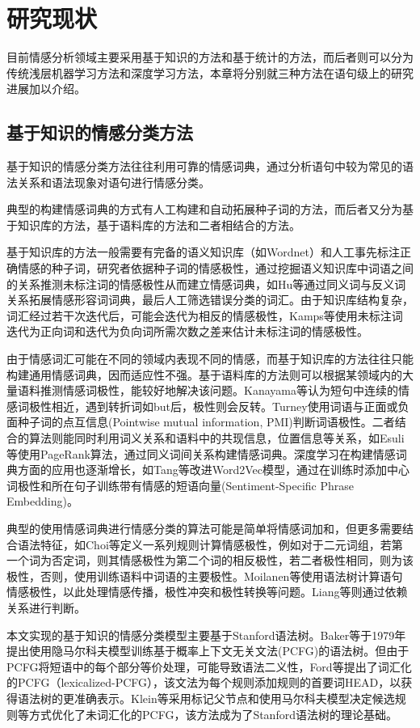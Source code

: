 \section{研究现状}
目前情感分析领域主要采用基于知识的方法和基于统计的方法，而后者则可以分为传统浅层机器学习方法和深度学习方法，本章将分别就三种方法在语句级上的研究进展加以介绍。
\subsection{基于知识的情感分类方法}
基于知识的情感分类方法往往利用可靠的情感词典，通过分析语句中较为常见的语法关系和语法现象对语句进行情感分类。

典型的构建情感词典的方式有人工构建和自动拓展种子词的方法，而后者又分为基于知识库的方法，基于语料库的方法和二者相结合的方法\cite{Wang2016}。

基于知识库的方法一般需要有完备的语义知识库（如Wordnet）和人工事先标注正确情感的种子词，研究者依据种子词的情感极性，通过挖掘语义知识库中词语之间的关系推测未标注词的情感极性从而建立情感词典，如Hu\cite{huliu2004a}等通过同义词与反义词关系拓展情感形容词词典，最后人工筛选错误分类的词汇。由于知识库结构复杂，词汇经过若干次迭代后，可能会迭代为相反的情感极性，Kamps等\cite{Kamps04a}使用未标注词迭代为正向词和迭代为负向词所需次数之差来估计未标注词的情感极性。

由于情感词汇可能在不同的领域内表现不同的情感，而基于知识库的方法往往只能构建通用情感词典，因而适应性不强。基于语料库的方法则可以根据某领域内的大量语料推测情感词极性，能较好地解决该问题。Kanayama等\cite{Kanayama2006}认为短句中连续的情感词极性相近，遇到转折词如but后，极性则会反转。Turney\cite{turneylittman2003}使用词语与正面或负面种子词的点互信息(Pointwise mutual information, PMI)判断词语极性。二者结合的算法则能同时利用词义关系和语料中的共现信息，位置信息等关系，如Esuli\cite{Esuli2007}等使用PageRank算法，通过同义词间关系构建情感词典。深度学习在构建情感词典方面的应用也逐渐增长，如Tang\cite{Tang2014b}等改进Word2Vec模型，通过在训练时添加中心词极性和所在句子训练带有情感的短语向量(Sentiment-Specific Phrase Embedding)。

典型的使用情感词典进行情感分类的算法可能是简单将情感词加和，但更多需要结合语法特征，如Choi等\cite{Choi2008}定义一系列规则计算情感极性，例如对于二元词组，若第一个词为否定词，则其情感极性为第二个词的相反极性，若二者极性相同，则为该极性，否则，使用训练语料中词语的主要极性。Moilanen等\cite{Moilanen2007}使用语法树计算语句情感极性，以此处理情感传播，极性冲突和极性转换等问题。Liang等\cite{Liang2013}则通过依赖关系进行判断。

本文实现的基于知识的情感分类模型主要基于Stanford语法树。Baker等\cite{Baker79}于1979年提出使用隐马尔科夫模型训练基于概率上下文无关文法(PCFG)的语法树。但由于PCFG将短语中的每个部分等价处理，可能导致语法二义性，Ford等\cite{Ford1982}提出了词汇化的PCFG（lexicalized-PCFG），该文法为每个规则添加规则的首要词HEAD，以获得语法树的更准确表示。Klein等\cite{Klein2003}采用标记父节点和使用马尔科夫模型决定候选规则等方式优化了未词汇化的PCFG，该方法成为了Stanford语法树的理论基础。
